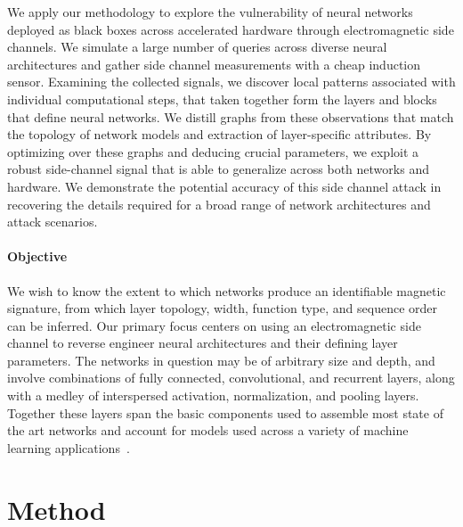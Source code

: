 \documentclass[12pt]{report}
\begin{document}
We apply our methodology to explore the vulnerability of neural networks deployed as
black boxes across accelerated hardware through electromagnetic side channels.
We simulate a large number of queries across diverse neural architectures
and gather side channel measurements with a cheap induction sensor.
Examining the collected signals, we discover local patterns associated with
individual computational steps, that taken together form the layers and blocks
that define neural networks.
We distill graphs from these observations that match the topology of network models
and extraction of layer-specific attributes.
By optimizing over these graphs and deducing crucial parameters,
we exploit a robust side-channel signal
that is able to generalize across both networks and hardware.
We demonstrate the potential accuracy of this side channel attack
in recovering the details required for a broad range of 
network architectures and attack scenarios.

\vspace{-2mm}
\paragraph{Objective}

We wish to know the extent to which networks
produce an identifiable magnetic signature, 
from which layer topology, width, function type, 
and sequence order can be inferred.
Our primary focus centers on using an electromagnetic side channel to 
reverse engineer neural architectures and their defining layer parameters.
The networks in question may be of arbitrary size and depth, and involve
combinations of fully connected, convolutional, and recurrent layers,
along with a medley of interspersed activation, normalization, and pooling
layers.
Together these layers span the basic components used to assemble most
state of the art networks and account for models used across a variety of 
machine learning 
applications~\cite{he2016vision,xu2017security,teufl2010nlp,kober2013robotics,Simonyan2014vgg,krizhevsky2012imagenet}. 

\vspace{-3mm}
\section{Method}\label{sec:snoop_method}
\end{document}

